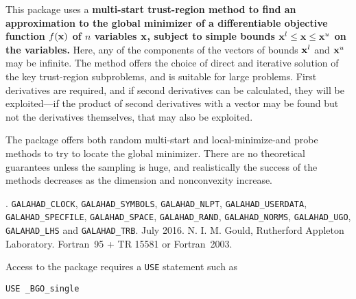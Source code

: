 \documentclass{galahad}
\newcommand{\packagename}{BGO}
\newcommand{\fullpackagename}{\libraryname\_\packagename}
\begin{document}
\galheader


\galsummary
This package uses a {\bf multi-start trust-region method to find an
approximation to the global minimizer of a differentiable objective
function $f({\mathbf{x}})$ of $n$ variables ${\mathbf{x}}$, subject to simple bounds
${\mathbf{x}}^l \leq {\mathbf{x}} \leq {\mathbf{x}}^u$ on the variables.}
Here, any of the components of the vectors of bounds ${\mathbf{x}}^l$ and ${\mathbf{x}}^u$
may be infinite. The method offers the choice of direct
and iterative solution of the key trust-region subproblems, and
is suitable for large problems. First derivatives are required,
and if second derivatives can be calculated, they will be exploited---if
the product of second derivatives with a vector may be found but
not the derivatives themselves, that may also be exploited.

The package offers both random multi-start and local-minimize-and probe
methods to try to locate the global minimizer. There are no theoretical
guarantees unless the sampling is huge, and realistically the success of
the methods decreases as the dimension and nonconvexity increase.


\galattributes
\galversions{\tt  \fullpackagename\_single, \fullpackagename\_double}.
\galuses
{\tt GALAHAD\_CLOCK},
{\tt GALAHAD\_SY\-M\-BOLS},
{\tt GALAHAD\_NLPT},
{\tt GALAHAD\_USERDATA},
{\tt GALAHAD\_SPECFILE},
{\tt GALAHAD\_SPACE},
{\tt GALAHAD\_RAND},
{\tt GALAHAD\_\-NORMS},
{\tt GALAHAD\_UGO},
{\tt GALAHAD\_LHS}
and
{\tt GALAHAD\_TRB}.
\galdate July 2016.
\galorigin N. I. M. Gould, Rutherford Appleton Laboratory.
\gallanguage Fortran~95 + TR 15581 or Fortran~2003.


\galhowto


Access to the package requires a {\tt USE} statement such as

\medskip{}

\hspace{8mm} {\tt USE \fullpackagename\_single}

\medskip{}
\end{document}
